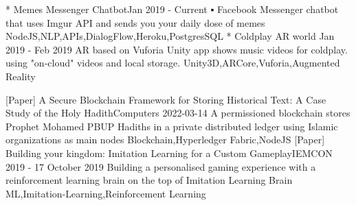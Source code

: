 %
%

\twocolumnsection
{ 
\begin{projects}
		\project
	{* Memes Messenger Chatbot}{Jan 2019 - Current}
	{ }
	{▪	Facebook Messenger chatbot that uses Imgur API and sends you your daily dose of memes }
	{NodeJS,NLP,APIs,DialogFlow,Heroku,PostgresSQL}
		\project
	{* Coldplay AR world }{Jan 2019 - Feb 2019}
	{ 
	}
	{AR based on Vuforia Unity app shows music videos for coldplay. using "on-cloud" videos and local storage.}
	{Unity3D,ARCore,Vuforia,Augmented Reality}
\end{projects}}
{
\begin{projects}
		\project
	{[Paper] A Secure Blockchain Framework for Storing Historical Text: A Case Study of the Holy Hadith}{Computers 2022-03-14}
	{\paperSymbol{ }
	}
	{A permissioned blockchain stores Prophet Mohamed PBUP Hadiths in a private distributed ledger using Islamic organizations as main nodes }
	{Blockchain,Hyperledger Fabric,NodeJS}	
			\project
	{[Paper] Building your kingdom: Imitation Learning for a Custom Gameplay}{IEMCON 2019 - 17 October 2019}
	{\paperSymbol{ }
	}
	{Building a personalised gaming experience with a reinforcement learning brain on the top of Imitation Learning Brain}
	{ML,Imitation-Learning,Reinforcement Learning} 
\end{projects}}


